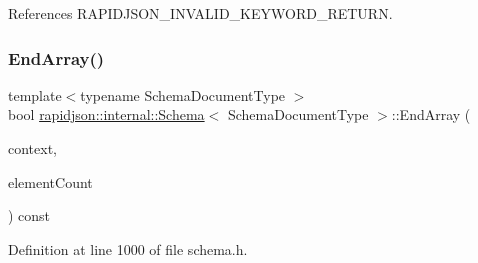 References R\+A\+P\+I\+D\+J\+S\+O\+N\+\_\+\+I\+N\+V\+A\+L\+I\+D\+\_\+\+K\+E\+Y\+W\+O\+R\+D\+\_\+\+R\+E\+T\+U\+RN.

\mbox{\label{classrapidjson_1_1internal_1_1_schema_ae2beb58e80015e84b276f38b8f699bd8}} 
\subsubsection{\texorpdfstring{EndArray()}{EndArray()}}
{\footnotesize\ttfamily template$<$typename Schema\+Document\+Type $>$ \\
bool \mbox{\hyperlink{classrapidjson_1_1internal_1_1_schema}{rapidjson\+::internal\+::\+Schema}}$<$ Schema\+Document\+Type $>$\+::End\+Array (\begin{DoxyParamCaption}\item[{\mbox{\hyperlink{classrapidjson_1_1internal_1_1_schema_afca06b1f51d1bc18403bdf3f4d55ffef}{Context}} \&}]{context,  }\item[{\mbox{\hyperlink{namespacerapidjson_a44eb33eaa523e36d466b1ced64b85c84}{Size\+Type}}}]{element\+Count }\end{DoxyParamCaption}) const}



Definition at line 1000 of file schema.\+h.


